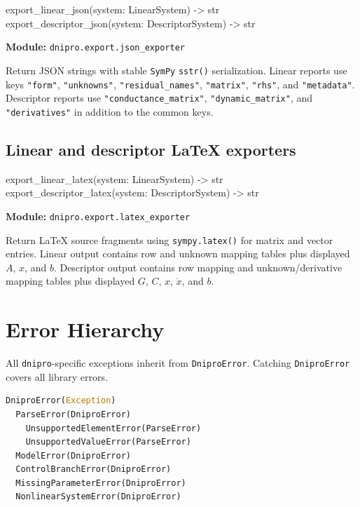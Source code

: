 \documentclass[11pt,a4paper]{article}
\newcommand{\project}{\texttt{dnipro}}
\newcommand{\code}[1]{\texttt{#1}}
\newcommand{\sympy}{\texttt{SymPy}}
\newenvironment{apisig}{%
  \begin{trivlist}\item\relax\ttfamily\small
}{%
  \end{trivlist}
}
\begin{document}
\begin{apisig}
export\_linear\_json(system: LinearSystem) -> str \\
export\_descriptor\_json(system: DescriptorSystem) -> str
\end{apisig}

\textbf{Module:} \code{dnipro.export.json\_exporter}

Return JSON strings with stable \sympy{} \code{sstr()} serialization. Linear
reports use keys \code{"form"}, \code{"unknowns"}, \code{"residual\_names"},
\code{"matrix"}, \code{"rhs"}, and \code{"metadata"}. Descriptor reports use
\code{"conductance\_matrix"}, \code{"dynamic\_matrix"}, and \code{"derivatives"}
in addition to the common keys.

\subsection{Linear and descriptor LaTeX exporters}
\label{api:linear_descriptor_latex_exporters}

\begin{apisig}
export\_linear\_latex(system: LinearSystem) -> str \\
export\_descriptor\_latex(system: DescriptorSystem) -> str
\end{apisig}

\textbf{Module:} \code{dnipro.export.latex\_exporter}

Return \LaTeX{} source fragments using \code{sympy.latex()} for matrix and vector
entries. Linear output contains row and unknown mapping tables plus displayed
\(A\), \(x\), and \(b\). Descriptor output contains row mapping and
unknown/derivative mapping tables plus displayed \(G\), \(C\), \(x\),
\(\dot{x}\), and \(b\).

\section{Error Hierarchy}
\label{sec:errors}

All \project{}-specific exceptions inherit from \code{DniproError}.
Catching \code{DniproError} covers all library errors.

\begin{lstlisting}[language=Python]
DniproError(Exception)
  ParseError(DniproError)
    UnsupportedElementError(ParseError)
    UnsupportedValueError(ParseError)
  ModelError(DniproError)
  ControlBranchError(DniproError)
  MissingParameterError(DniproError)
  NonlinearSystemError(DniproError)
\end{lstlisting}
\end{document}
